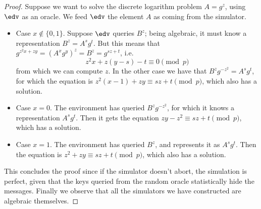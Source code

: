 \begin{proof}
    Suppose we want to solve the discrete logarithm problem $A=g^z$, using $\edv$ as an oracle. We feed $\edv$ the element $A$ as coming from the simulator.
    \begin{itemize}
        \item Case $x\not\in\{0,1\}$. Suppose $\edv$ queries $B^z$; being algebraic, it must know a representation $B^z=A^sg^t$. But this means that $g^{z^2x+zy}=(A^xg^y)^z=B^z=g^{sz+t}$, i.e. $$z^2x+z(y-s)-t\equiv 0\pmod p$$ from which we can compute $z$. In the other case we have that $B^zg^{-z^2}=A^sg^t$, for which the equation is $z^2(x-1)+zy\equiv sz+t\pmod p$, which also has a solution.
        \item Case $x=0$. The environment has queried $B^zg^{-z^2}$, for which it knows a representation $A^sg^t$. Then it gets the equation $zy-z^2\equiv sz+t\pmod p$, which has a solution.
        \item Case $x=1$. The environment has queried $B^z$, and represents it as $A^sg^t$. Then the equation is $z^2+zy\equiv sz+t\pmod p$, which also has a solution.
    \end{itemize}

    This concludes the proof since if the simulator doesn't abort, the simulation is perfect, given that the keys queried from the random oracle statistically hide the messages. Finally we observe that all the simulators we have constructed are algebraic themselves.
\end{proof}
